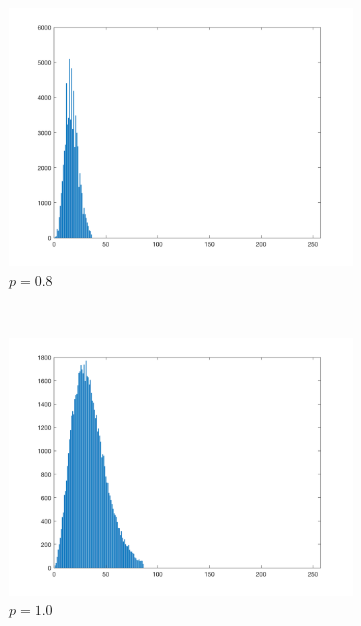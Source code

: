 \documentclass{article}
\begin{document}
\begin{enumerate}[label=(\alph*)]
\begin{figure}[!htb]
        \begin{subfigure}[b]{0.3\textwidth}
            \includegraphics[width=\textwidth]{img/hist_PL08.png}
            \caption{$p = 0.8$}
        \end{subfigure}
        ~
        \begin{subfigure}[b]{0.3\textwidth}
            \includegraphics[width=\textwidth]{img/hist_PL10.png}
            \caption{$p = 1.0$}
        \end{subfigure}
        ~
        \begin{subfigure}[b]{0.3\textwidth}

\end{subfigure}
\end{figure}
\end{enumerate}
\end{document}
